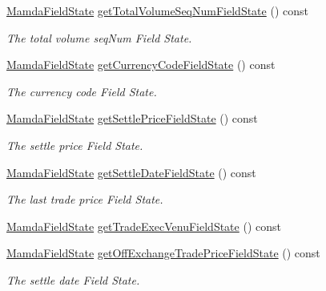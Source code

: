 \begin{CompactItemize}
\hyperlink{namespaceWombat_93aac974f2ab713554fd12a1fa3b7d2a}{Mamda\-Field\-State} \hyperlink{classWombat_1_1MamdaTradeListener_399c33640428f8e7a5cd5e5eabc79ef8}{get\-Total\-Volume\-Seq\-Num\-Field\-State} () const 
\begin{CompactList}\small\item\em The total volume seq\-Num Field State. \item\end{CompactList}\item 
\hyperlink{namespaceWombat_93aac974f2ab713554fd12a1fa3b7d2a}{Mamda\-Field\-State} \hyperlink{classWombat_1_1MamdaTradeListener_775a85fc8f9a1c5ecb10e7576ca0165e}{get\-Currency\-Code\-Field\-State} () const 
\begin{CompactList}\small\item\em The currency code Field State. \item\end{CompactList}\item 
\hyperlink{namespaceWombat_93aac974f2ab713554fd12a1fa3b7d2a}{Mamda\-Field\-State} \hyperlink{classWombat_1_1MamdaTradeListener_f487197ee5cad3e13470e8363e667702}{get\-Settle\-Price\-Field\-State} () const 
\begin{CompactList}\small\item\em The settle price Field State. \item\end{CompactList}\item 
\hyperlink{namespaceWombat_93aac974f2ab713554fd12a1fa3b7d2a}{Mamda\-Field\-State} \hyperlink{classWombat_1_1MamdaTradeListener_75af0c0e81cb87dcf0029f79ecb13262}{get\-Settle\-Date\-Field\-State} () const 
\begin{CompactList}\small\item\em The last trade price Field State. \item\end{CompactList}\item 
\hyperlink{namespaceWombat_93aac974f2ab713554fd12a1fa3b7d2a}{Mamda\-Field\-State} \hyperlink{classWombat_1_1MamdaTradeListener_2a891807c470a26962835489ee1065c1}{get\-Trade\-Exec\-Venu\-Field\-State} () const 
\item 
\hyperlink{namespaceWombat_93aac974f2ab713554fd12a1fa3b7d2a}{Mamda\-Field\-State} \hyperlink{classWombat_1_1MamdaTradeListener_7939de727c94506247b065996e9ef1b5}{get\-Off\-Exchange\-Trade\-Price\-Field\-State} () const 
\begin{CompactList}\small\item\em The settle date Field State. \item\end{CompactList}\item 

\end{CompactItemize}
